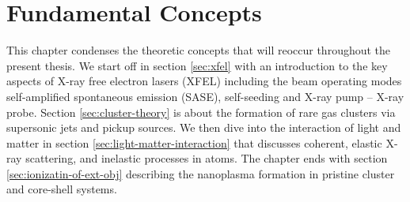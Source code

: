 \chapter{Fundamental Concepts}\label{ch:fundamental_concepts}
This chapter condenses the theoretic concepts that will reoccur throughout the present thesis. We start off in section \ref{sec:xfel} with an introduction to the key aspects of X-ray free electron lasers (XFEL) including the beam operating modes self-amplified spontaneous emission (SASE), self-seeding and X-ray pump -- X-ray probe. Section \ref{sec:cluster-theory} is about the formation of rare gas clusters via supersonic jets and pickup sources. We then dive into the interaction of light and matter in section \ref{sec:light-matter-interaction} that discusses coherent, elastic X-ray scattering, and inelastic processes in atoms. The chapter ends with section \ref{sec:ionizatin-of-ext-obj} describing the nanoplasma formation in pristine cluster and core-shell systems.
%
%
%
